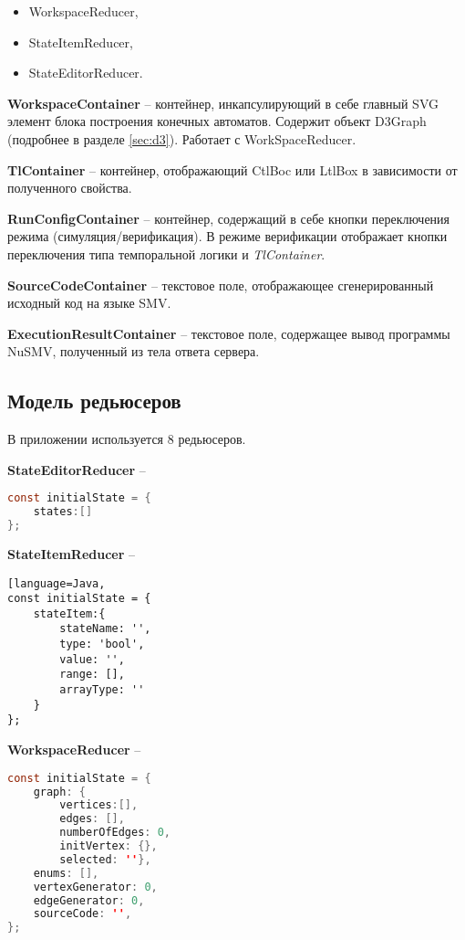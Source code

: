 \begin{itemize}
	\item WorkspaceReducer,
	\item StateItemReducer,
	\item StateEditorReducer.
\end{itemize}

\textbf{WorkspaceContainer} -- контейнер, инкапсулирующий в себе главный SVG элемент блока построения конечных автоматов. Содержит объект D3Graph (подробнее в разделе \ref{sec:d3}). Работает с WorkSpaceReducer.

\textbf{TlContainer} -- контейнер, отображающий CtlBoc или LtlBox в зависимости от полученного свойства.

\textbf{RunConfigContainer} -- контейнер, содержащий в себе кнопки переключения режима (симуляция/верификация). В режиме верификации отображает кнопки переключения типа темпоральной логики и \textit{TlContainer}.

\textbf{SourceCodeContainer} -- текстовое поле, отображающее сгенерированный исходный код на языке SMV.

\textbf{ExecutionResultContainer} -- текстовое поле, содержащее вывод программы NuSMV, полученный из тела ответа сервера.

\subsection{Модель редьюсеров}

В приложении используется 8 редьюсеров.

\textbf{StateEditorReducer} --

\begin{lstlisting}[language=Java,
				   caption={Инициализация состояния StateEditorReducer.}]
const initialState = {
	states:[]
};
\end{lstlisting}


\textbf{StateItemReducer} --

\begin{lstlisting}[language=Java,
const initialState = {
	stateItem:{
		stateName: '',
		type: 'bool',
		value: '',
		range: [],
		arrayType: ''
	}
};
\end{lstlisting}


\textbf{WorkspaceReducer} --

\begin{lstlisting}[language=Java,
caption={Инициализация состояния WorkspaceReducer.}]
const initialState = {
	graph: {
		vertices:[],
		edges: [],
		numberOfEdges: 0,
		initVertex: {},
		selected: ''},
	enums: [],
	vertexGenerator: 0,
	edgeGenerator: 0,
	sourceCode: '',
};
\end{lstlisting}


